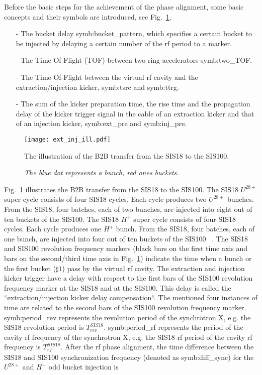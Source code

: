 
Before the basic steps for the achievement of the phase alignment, some basic concepts and their symbols are introduced, see Fig.~\ref{ext_inj_kicker}.

\begin{itemize}
\item[-] The bucket delay \gls{symb:bucket_pattern}, which specifies a certain bucket to be injected by delaying a certain number of the rf period to a marker.
\item[-] The Time-Of-Flight (\gls{TOF}) between two ring accelerators \gls{symb:two_TOF}. 
\item[-] The Time-Of-Flight between the virtual rf cavity and the extraction/injection kicker, \gls{symb:tsrc} and \gls{symb:ttrg}. 
\item[-] The sum of the kicker preparation time, the rise time and the propagation delay of the kicker trigger signal in the cable of an extraction kicker and that of an injection kicker, \gls{symb:ext_pre} and \gls{symb:inj_pre}.
\end{itemize}
\begin{figure}[!htb]
   \centering   
   \texttt{[image: ext\_inj\_ill.pdf]}
   \caption{The illustration of the B2B transfer from the SIS18 to the SIS100.}
	\caption*{\textsl{\small{The blue dot represents a bunch, red ones buckets.}}}
   \label{ext_inj_kicker}
\end{figure}
Fig.~\ref{ext_inj_kicker} illustrates the B2B transfer from the SIS18 to the SIS100. The SIS18 $U^{28+}$ super cycle consists of four SIS18 cycles. Each cycle produces two $U^{28+}$ bunches. From the SIS18, four batches, each of two bunches, are injected into eight out of ten buckets of the SIS100. The SIS18 $H^{+}$ super cycle consists of four SIS18 cycles. Each cycle produces one $H^{+}$ bunch. From the SIS18, four batches, each of one bunch, are injected into four out of ten buckets of the SIS100 ~\cite{liebermann_fair_2013, liebermann_sis100_2013}. The SIS18 and SIS100 revolution frequency markers (black bars on the first time axis and bars on the second/third time axis in Fig.~\ref{ext_inj_kicker}) indicate the time when a bunch or the first bucket ($\sharp1$) pass by the virtual rf cavity. The extraction and injection kicker trigger have a delay with respect to the first bars of the SIS100 revolution frequency marker at the SIS18 and at the SIS100. This delay is called the ``extraction/injection kicker delay compensation``. The mentioned four instances of time are related to the second bars of the SIS100 revolution frequency marker. \gls{symb:period_rev} represents the revolution period of the synchrotron X, e.g. the SIS18 revolution period is $T_{\mathit{rev}}^{\mathit{SIS18}}$. \gls{symb:period_rf} represents the period of the cavity rf frequency of the synchrotron X, e.g. the SIS18 rf period of the cavity rf frequency is $T_{\mathit{rf}}^{\mathit{SIS18}}$. After the rf phase alignment, the time difference between the SIS18 and SIS100 synchronization frequency (denoted as \gls{symb:diff_sync}) for the $U^{28+}$ and $H^{+}$ odd bucket injection is

